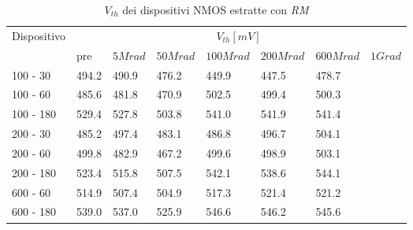 \documentclass[12pt, letterpaper]{book}
\begin{document}
\begin{table}[H]
  \renewcommand{\arraystretch}{1.3}
  \begin{tabular}{m{2cm} m{0.8cm} m{1.1cm} m{1.3cm} m{1.5cm} m{1.5cm} m{1.5cm} m{1cm}}
    \toprule
    \multirow{2}{*}{Dispositivo} & \multicolumn{7}{c}{$V_{th} [mV] $}                                                                    \\
    \cmidrule{2-8}
                                 & pre                                & $5Mrad$ & $50Mrad$ & $100Mrad$ & $200Mrad$ & $600Mrad$ & $1Grad$ \\
    \midrule
    100 - 30                     & 494.2                              & 490.9   & 476.2    & 449.9     & 447.5     & 478.7     &         \\
    \hline
    100 - 60                     & 485.6                              & 481.8   & 470.9    & 502.5     & 499.4     & 500.3     &         \\
    \hline
    100 - 180                    & 529.4                              & 527.8   & 503.8    & 541.0     & 541.9     & 541.4     &         \\
    \hline
    200 - 30                     & 485.2                              & 497.4   & 483.1    & 486.8     & 496.7     & 504.1     &         \\
    \hline
    200 - 60                     & 499.8                              & 482.9   & 467.2    & 499.6     & 498.9     & 503.1     &         \\
    \hline
    200 - 180                    & 523.4                              & 515.8   & 507.5    & 542.1     & 538.6     & 544.1     &         \\
    \hline
    600 - 60                     & 514.9                              & 507.4   & 504.9    & 517.3     & 521.4     & 521.2     &         \\
    \hline
    600 - 180                    & 539.0                              & 537.0   & 525.9    & 546.6     & 546.2     & 545.6     &         \\
    \bottomrule
  \end{tabular}
  \caption{$V_{th}$ dei dispositivi NMOS estratte con \emph{RM}}
  \label{tab:VthRMN}
\end{table}
\end{document}
